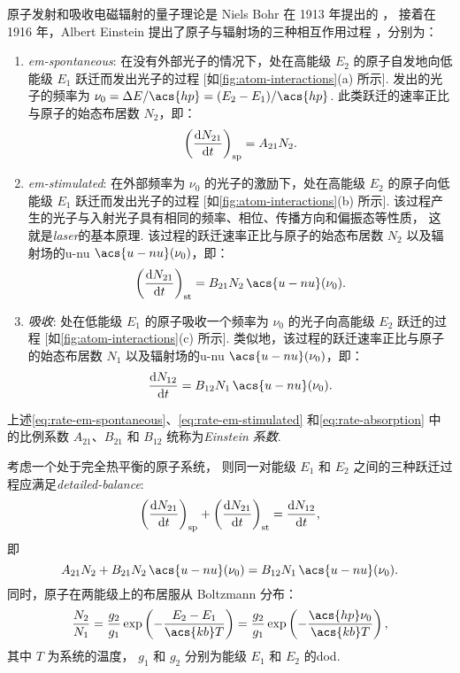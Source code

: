 原子发射和吸收电磁辐射的量子理论是 Niels Bohr 在 1913 年提出的 \cite{bohr1913}，
接着在 1916 年，Albert Einstein 提出了原子与辐射场的三种相互作用过程
\cite{einstein1916}，分别为：
\begin{enumerate}
\item \emph{\acf{em-spontaneous}}:
  在没有外部光子的情况下，处在高能级 $E_2$ 的原子自发地向低能级 $E_1$
  跃迁而发出光子的过程 [如\autoref{fig:atom-interactions}(a) 所示].
  发出的光子的频率为 $\nu_0 = \Delta E / \acs{hp} = (E_2 - E_1) / \acs{hp}$.
  此类跃迁的速率正比与原子的始态布居数 $N_2$，即：
  \begin{equation}
    \label{eq:rate-em-spontaneous}
    \left( \frac{\mathrm{d}N_{21}}{\mathrm{d}t} \right)_{\mathrm{sp}} = A_{21} N_2 .
  \end{equation}

\item \emph{\acf{em-stimulated}}:
  在外部频率为 $\nu_0$ 的光子的激励下，处在高能级 $E_2$ 的原子向低能级 $E_1$
  跃迁而发出光子的过程 [如\autoref{fig:atom-interactions}(b) 所示].
  该过程产生的光子与入射光子具有相同的频率、相位、传播方向和偏振态等性质，
  这就是\emph{\acf{laser}}的基本原理.
  该过程的跃迁速率正比与原子的始态布居数 $N_2$
  以及辐射场的\acl{u-nu} $\acs{u-nu}(\nu_0)$，即：
  \begin{equation}
    \label{eq:rate-em-stimulated}
    \left( \diff{N_{21}}{t} \right)_{\R{st}}
      = B_{21} N_2 \, \acs{u-nu}(\nu_0) .
  \end{equation}

\item \emph{吸收}:
  处在低能级 $E_1$ 的原子吸收一个频率为 $\nu_0$ 的光子向高能级 $E_2$ 跃迁的过程
  [如\autoref{fig:atom-interactions}(c) 所示].
  类似地，该过程的跃迁速率正比与原子的始态布居数 $N_1$
  以及辐射场的\acl{u-nu} $\acs{u-nu}(\nu_0)$，即：
  \begin{equation}
    \label{eq:rate-absorption}
    \diff{N_{12}}{t} = B_{12} N_1 \, \acs{u-nu}(\nu_0) .
  \end{equation}
\end{enumerate}
上述\autoref{eq:rate-em-spontaneous}、\autoref{eq:rate-em-stimulated}
和\autoref{eq:rate-absorption} 中的比例系数 $A_{21}$、$B_{21}$ 和 $B_{12}$
统称为\emph{Einstein 系数}.

考虑一个处于完全热平衡的原子系统，
则同一对能级 $E_1$ 和 $E_2$ 之间的三种跃迁过程应满足\emph{\acf{detailed-balance}}:
\begin{equation}
  \label{eq:detailed-balance1}
  \left( \frac{\mathrm{d}N_{21}}{\mathrm{d}t} \right)_{\mathrm{sp}}
    + \left( \frac{\mathrm{d}N_{21}}{\mathrm{d}t} \right)_{\mathrm{st}} = \frac{\mathrm{d}N_{12}}{\mathrm{d}t} ,
\end{equation}
即
\begin{equation}
  \label{eq:detailed-balance2}
  A_{21} N_2 + B_{21} N_2 \, \acs{u-nu}(\nu_0)
    = B_{12} N_1 \, \acs{u-nu}(\nu_0) .
\end{equation}
同时，原子在两能级上的布居服从 Boltzmann 分布：
\begin{equation}
  \label{eq:ratio-populations-te}
  \frac{N_2}{N_1}
    = \frac{g_2}{g_1} \exp\left( - \frac{E_2-E_1}{\acs{kb} T} \right)
    = \frac{g_2}{g_1} \exp\left( - \frac{\acs{hp} \nu_0}{\acs{kb} T} \right) ,
\end{equation}
其中 $T$ 为系统的温度，
$g_1$ 和 $g_2$ 分别为能级 $E_1$ 和 $E_2$ 的\acf{dod}.

